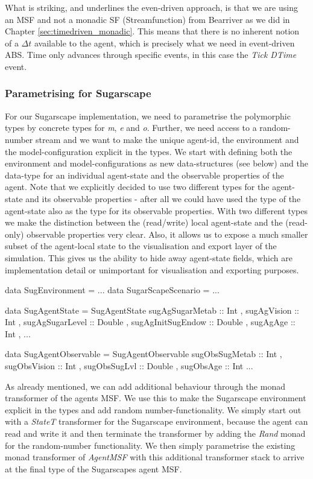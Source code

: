 What is striking, and underlines the even-driven approach, is that we are using an MSF and not a monadic SF (Streamfunction) from Bearriver as we did in Chapter \ref{sec:timedriven_monadic}. This means that there is no inherent notion of a $\Delta t$ available to the agent, which is precisely what we need in event-driven ABS. Time only advances through specific events, in this case the \textit{Tick DTime} event.

\subsubsection{Parametrising for Sugarscape}
For our Sugarscape implementation, we need to parametrise the polymorphic types by concrete types for \textit{m}, \textit{e} and \textit{o}. Further, we need access to a random-number stream and we want to make the unique agent-id, the environment and the model-configuration explicit in the types. We start with defining both the environment and model-configurations as new data-structures (see below) and the data-type for an individual agent-state and the observable properties of the agent. Note that we explicitly decided to use two different types for the agent-state and its observable properties - after all we could have used the type of the agent-state also as the type for its observable properties. With two different types we make the distinction between the (read/write) local agent-state and the (read-only) observable properties very clear. Also, it allows us to expose a much smaller subset of the agent-local state to the visualisation and export layer of the simulation. This gives us the ability to hide away agent-state fields, which are implementation detail or unimportant for visualisation and exporting purposes.

\begin{HaskellCode}
data SugEnvironment     = ...
data SugarScapeScenario = ...

data SugAgentState = SugAgentState
  { sugAgSugarMetab   :: Int
  , sugAgVision       :: Int
  , sugAgSugarLevel   :: Double
  , sugAgInitSugEndow :: Double
  , sugAgAge          :: Int
  , ...
  }
  
data SugAgentObservable = SugAgentObservable
  { sugObsSugMetab :: Int
  , sugObsVision   :: Int
  , sugObsSugLvl   :: Double
  , sugObsAge      :: Int
  ...  
  }
\end{HaskellCode}

As already mentioned, we can add additional behaviour through the monad transformer of the agents MSF. We use this to make the Sugarscape environment explicit in the types and add random number-functionality. We simply start out with a \textit{StateT} transformer for the Sugarscape environment, because the agent can read and write it and then terminate the transformer by adding the \textit{Rand} monad for the random-number functionality. We then simply parametrise the existing monad transformer of \textit{AgentMSF} with this additional transformer stack to arrive at the final type of the Sugarscapes agent MSF.


